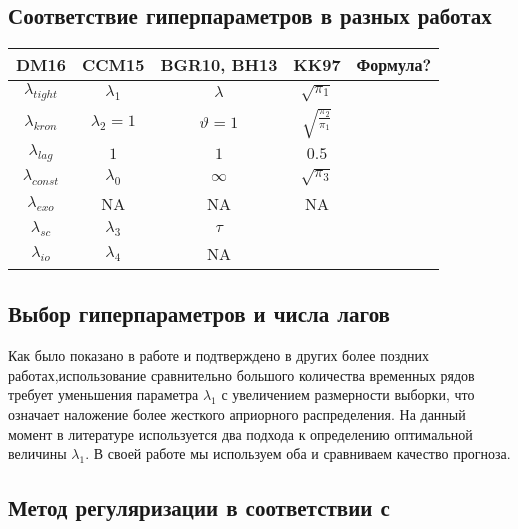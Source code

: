 \documentclass[11pt]{article} %
\begin{document}
\subsection{Соответствие гиперпараметров в разных работах}


\begin{center}
\begin{tabular}{ccccc}
\toprule
DM16 &  CCM15 &  BGR10, BH13 & KK97 &Формула? \\
\midrule
$\lambda_{tight}$ & $\lambda_1$ & $\lambda$ & $\sqrt{\pi_1}$ &\\
$\lambda_{kron}$ & $\lambda_2=1$ & $\vartheta=1$ &  $\sqrt{\frac{\pi_2}{\pi_1}}$&\\
$\lambda_{lag}$ & $1$ & $1$ & $0.5$&\\
$\lambda_{const}$  & $\lambda_0$ & $\infty$ &$ \sqrt{\pi_3}$& \\
$\lambda_{exo}$ & NA & NA & NA&\\
\midrule
$\lambda_{sc}$ & $\lambda_3$ & $\tau$ && \\
$\lambda_{io}$ & $\lambda_4$ & NA && \\
\bottomrule
\end{tabular}
\end{center}




\subsection{Выбор гиперпараметров и числа лагов}

Как было показано в работе \cite{demol_al_2008} и подтверждено в других более поздних работах,использование сравнительно большого количества временных рядов требует уменьшения параметра $\lambda_1$ с увеличением размерности выборки, что означает наложение более жесткого априорного распределения. На данный момент в литературе используется два подхода к определению оптимальной величины $\lambda_1$. В своей работе мы используем оба и сравниваем качество прогноза.

\subsection{Метод регуляризации в соответствии с \cite{banbura_al_2010}}
\end{document}

